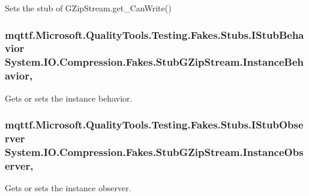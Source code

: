 Sets the stub of G\-Zip\-Stream.\-get\-\_\-\-Can\-Write()

\hypertarget{class_system_1_1_i_o_1_1_compression_1_1_fakes_1_1_stub_g_zip_stream_a22f57c429110516c04b6f26b237e51c1}{
\subsubsection[{Instance\-Behavior}]{\setlength{\rightskip}{0pt plus 5cm}mqttf.\-Microsoft.\-Quality\-Tools.\-Testing.\-Fakes.\-Stubs.\-I\-Stub\-Behavior System.\-I\-O.\-Compression.\-Fakes.\-Stub\-G\-Zip\-Stream.\-Instance\-Behavior\hspace{0.3cm}{\ttfamily [get]}, {\ttfamily [set]}}}\label{class_system_1_1_i_o_1_1_compression_1_1_fakes_1_1_stub_g_zip_stream_a22f57c429110516c04b6f26b237e51c1}


Gets or sets the instance behavior.

\hypertarget{class_system_1_1_i_o_1_1_compression_1_1_fakes_1_1_stub_g_zip_stream_a8e10be7537fcdfbedde9858d72b40165}{
\subsubsection[{Instance\-Observer}]{\setlength{\rightskip}{0pt plus 5cm}mqttf.\-Microsoft.\-Quality\-Tools.\-Testing.\-Fakes.\-Stubs.\-I\-Stub\-Observer System.\-I\-O.\-Compression.\-Fakes.\-Stub\-G\-Zip\-Stream.\-Instance\-Observer\hspace{0.3cm}{\ttfamily [get]}, {\ttfamily [set]}}}\label{class_system_1_1_i_o_1_1_compression_1_1_fakes_1_1_stub_g_zip_stream_a8e10be7537fcdfbedde9858d72b40165}


Gets or sets the instance observer.

